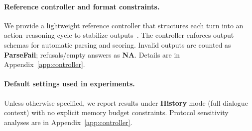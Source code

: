 \paragraph{Reference controller and format constraints.}
We provide a lightweight reference controller that structures each turn into an action--reasoning cycle to stabilize outputs~\citep{yao2023react,schick2023toolformer}.
The controller enforces output schemas for automatic parsing and scoring.
Invalid outputs are counted as \textbf{ParseFail}; refusals/empty answers as \textbf{NA}.
Details are in Appendix~\ref{app:controller}.

\paragraph{Default settings used in experiments.}
Unless otherwise specified, we report results under \textbf{History} mode (full dialogue context) with no explicit memory budget constraints.
Protocol sensitivity analyses are in Appendix~\ref{app:controller}.










